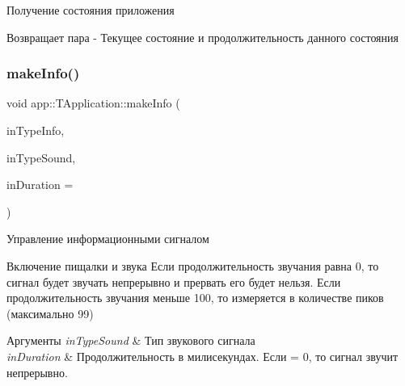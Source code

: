 Получение состояния приложения 

\begin{DoxyReturn}{Возвращает}
пара -\/ Текущее состояние и продолжительность данного состояния 
\end{DoxyReturn}
\mbox{\label{classapp_1_1_t_application_a1d5d4282bfbee6c984b10394f50a6cab}} 
\subsubsection{\texorpdfstring{make\+Info()}{makeInfo()}}
{\footnotesize\ttfamily void app\+::\+T\+Application\+::make\+Info (\begin{DoxyParamCaption}\item[{const \hyperlink{group___xD0_x9F_xD0_xB5_xD1_x80_xD0_xB5_xD1_x87_xD0_xB8_xD1_x81_xD0_xBB_xD0_xB5_xD0_xBD_xD0_xB8_xD1_x8F_gaf2797b8ed91d66a25b1b3b05ea7bcfc2}{app\+::type\+Info}}]{in\+Type\+Info,  }\item[{const \hyperlink{group___xD0_x9F_xD0_xB5_xD1_x80_xD0_xB5_xD1_x87_xD0_xB8_xD1_x81_xD0_xBB_xD0_xB5_xD0_xBD_xD0_xB8_xD1_x8F_ga33d8f1a04a907b6c65c5dfc88280ac6f}{app\+::type\+Sound}}]{in\+Type\+Sound,  }\item[{const uint32\+\_\+t}]{in\+Duration = {} }\end{DoxyParamCaption})}



Управление информационными сигналом 

Включение пищалки и звука Если продолжительность звучания равна 0, то сигнал будет звучать непрерывно и прервать его будет нельзя. Если продолжительность звучания меньше 100, то измеряется в количестве пиков (максимально 99) 
\begin{DoxyParams}{Аргументы}
{\em in\+Type\+Sound} & Тип звукового сигнала \\
\hline
{\em in\+Duration} & Продолжительность в милисекундах. Если = 0, то сигнал звучит непрерывно. \\
\hline
\end{DoxyParams}
\mbox{\label{classapp_1_1_t_application_a3df1835103a3ba338821c27ad05f9f8d}} 
